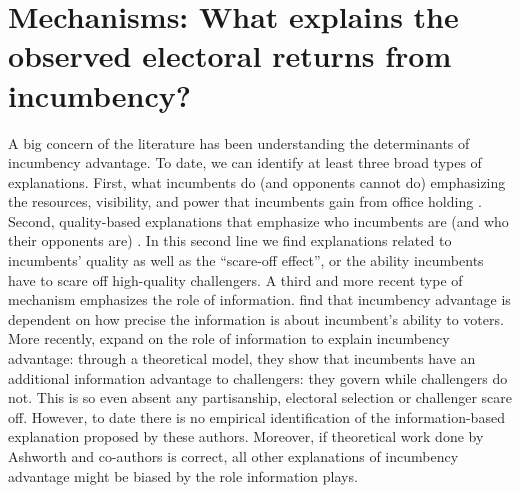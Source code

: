 \section{Mechanisms: What explains the observed electoral returns from incumbency? \label{sec:mechanisms}}
           
A big concern of the literature has been understanding the determinants of incumbency advantage. To date, we can identify at least three broad types of explanations. First, what incumbents do (and opponents cannot do) emphasizing the resources, visibility, and power that incumbents gain from office holding \citep{mayhew_1974, fiorina_1989, king_1991, cox_morgensten_1993}.  Second, quality-based explanations that emphasize who incumbents are (and who their opponents are) \citep{cox_katz_1996, levitt_wolfram_1997, ansolabehere_snyder_2000, eggers_2017}. In this second line we find explanations related to incumbents’ quality as well as the “scare-off effect”, or the ability incumbents have to scare off high-quality challengers. A third and more recent type of mechanism emphasizes the role of information. \citet{ashworth_bdm_2008} find that incumbency advantage is dependent on how precise the information is about incumbent’s ability to voters. More recently, \citet{ashworth_etal_2019} expand on the role of information to explain incumbency advantage: through a theoretical model, they show that incumbents have an additional information advantage to challengers: they govern while challengers do not. This is so even absent any partisanship, electoral selection or challenger scare off. However, to date there is no empirical identification of the information-based explanation proposed by these authors. Moreover, if theoretical work done by Ashworth and co-authors is correct, all other explanations of incumbency advantage might be biased by the role information plays. 
 
